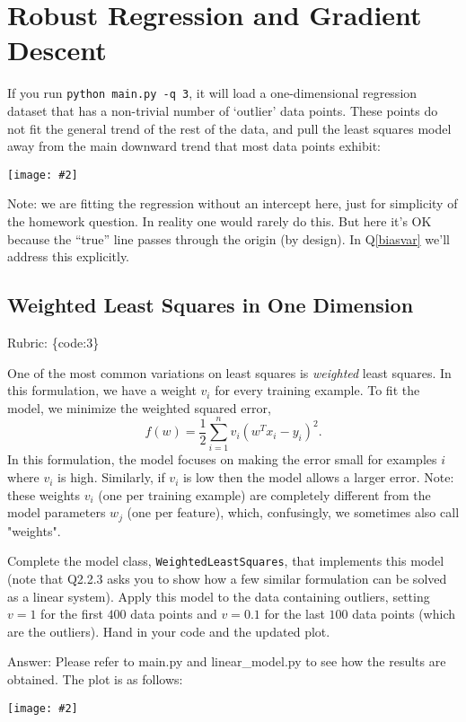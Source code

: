 \documentclass{article}
\def\rubric#1{\gre{Rubric: \{#1\}}}{}
\def\blu#1{{\color{blu}#1}}
\def\gre#1{{\color{gre}#1}}
\newcommand{\centerfig}[2]{\begin{center}\texttt{[image: \#2]}\end{center}}
\begin{document}
\section{Robust Regression and Gradient Descent}

If you run \verb|python main.py -q 3|, it will load a one-dimensional regression
dataset that has a non-trivial number of `outlier' data points.
These points do not fit the general trend of the rest of the data,
and pull the least squares model away from the main downward trend that most data points exhibit:
\centerfig{.7}{../figs/least_squares_outliers.pdf}

Note: we are fitting the regression without an intercept here, just for simplicity of the homework question.
In reality one would rarely do this. But here it's OK because the ``true'' line
passes through the origin (by design). In Q\ref{biasvar} we'll address this explicitly.

\subsection{Weighted Least Squares in One Dimension}
\rubric{code:3}

One of the most common variations on least squares is \emph{weighted} least squares. In this formulation, we have a weight $v_i$ for every training example. To fit the model, we minimize the weighted squared error,
\[
f(w) =  \frac{1}{2}\sum_{i=1}^n v_i(w^Tx_i - y_i)^2.
\]
In this formulation, the model focuses on making the error small for examples $i$ where $v_i$ is high. Similarly, if $v_i$ is low then the model allows a larger error. Note: these weights $v_i$ (one per training example) are completely different from the model parameters $w_j$ (one per feature), which, confusingly, we sometimes also call "weights".

Complete the model class, \texttt{WeightedLeastSquares}, that implements this model
(note that Q2.2.3 asks you to show how a few similar formulation can be solved as a linear system).
Apply this model to the data containing outliers, setting $v = 1$ for the first
$400$ data points and $v = 0.1$ for the last $100$ data points (which are the outliers).
\blu{Hand in your code and the updated plot}.

\gre{Answer: Please refer to main.py and linear\_model.py to see how the results are obtained.
The plot is as follows:
}

\centerfig{.5}{../figs/Weighted_least_squares_outliers.pdf}
\end{document}
